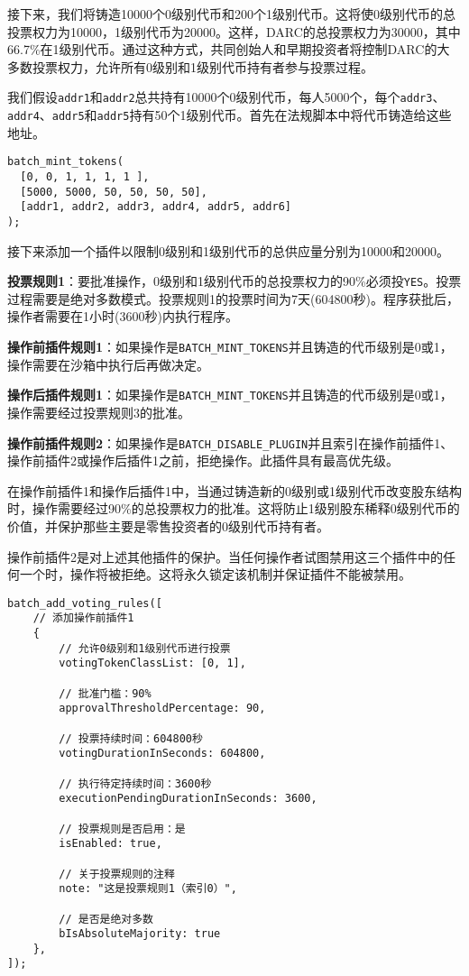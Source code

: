\documentclass[main.tex]{subfiles}
\begin{document}
接下来，我们将铸造10000个0级别代币和200个1级别代币。这将使0级别代币的总投票权力为10000，1级别代币为20000。这样，DARC的总投票权力为30000，其中66.7\%在1级别代币。通过这种方式，共同创始人和早期投资者将控制DARC的大多数投票权力，允许所有0级别和1级别代币持有者参与投票过程。

我们假设\texttt{addr1}和\texttt{addr2}总共持有10000个0级别代币，每人5000个，每个\texttt{addr3}、\texttt{addr4}、\texttt{addr5}和\texttt{addr5}持有50个1级别代币。首先在法规脚本中将代币铸造给这些地址。

\begin{verbatim}
batch_mint_tokens(
  [0, 0, 1, 1, 1, 1 ], 
  [5000, 5000, 50, 50, 50, 50], 
  [addr1, addr2, addr3, addr4, addr5, addr6]
);
\end{verbatim}

接下来添加一个插件以限制0级别和1级别代币的总供应量分别为10000和20000。

\textbf{投票规则1}：要批准操作，0级别和1级别代币的总投票权力的90\%必须投\texttt{YES}。投票过程需要是绝对多数模式。投票规则1的投票时间为7天(604800秒)。程序获批后，操作者需要在1小时(3600秒)内执行程序。

\textbf{操作前插件规则1}：如果操作是\texttt{BATCH\_MINT\_TOKENS}并且铸造的代币级别是0或1，操作需要在沙箱中执行后再做决定。

\textbf{操作后插件规则1}：如果操作是\texttt{BATCH\_MINT\_TOKENS}并且铸造的代币级别是0或1，操作需要经过投票规则3的批准。

\textbf{操作前插件规则2}：如果操作是\texttt{BATCH\_DISABLE\_PLUGIN}并且索引在操作前插件1、操作前插件2或操作后插件1之前，拒绝操作。此插件具有最高优先级。

在操作前插件1和操作后插件1中，当通过铸造新的0级别或1级别代币改变股东结构时，操作需要经过90\%的总投票权力的批准。这将防止1级别股东稀释0级别代币的价值，并保护那些主要是零售投资者的0级别代币持有者。

操作前插件2是对上述其他插件的保护。当任何操作者试图禁用这三个插件中的任何一个时，操作将被拒绝。这将永久锁定该机制并保证插件不能被禁用。

\begin{verbatim}
batch_add_voting_rules([
    // 添加操作前插件1
    {
        // 允许0级别和1级别代币进行投票
        votingTokenClassList: [0, 1], 

        // 批准门槛：90%
        approvalThresholdPercentage: 90,

        // 投票持续时间：604800秒
        votingDurationInSeconds: 604800,

        // 执行待定持续时间：3600秒
        executionPendingDurationInSeconds: 3600,

        // 投票规则是否启用：是
        isEnabled: true,

        // 关于投票规则的注释
        note: "这是投票规则1（索引0）",

        // 是否是绝对多数
        bIsAbsoluteMajority: true
    },
]);
\end{verbatim}
\end{document}

